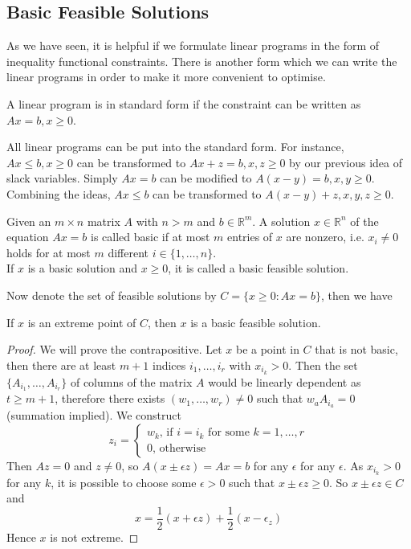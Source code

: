 \subsection{Basic Feasible Solutions}
As we have seen, it is helpful if we formulate linear programs in the form of inequality functional constraints.
There is another form which we can write the linear programs in order to make it more convenient to optimise.
\begin{definition}
    A linear program is in standard form if the constraint can be written as $Ax=b,x\ge 0$.
\end{definition}
All linear programs can be put into the standard form.
For instance, $Ax\le b,x\ge 0$ can be transformed to $Ax+z=b,x,z\ge 0$ by our previous idea of slack variables.
Simply $Ax=b$ can be modified to $A(x-y)=b,x,y\ge 0$.
Combining the ideas, $Ax\le b$ can be transformed to $A(x-y)+z,x,y,z\ge 0$.
\begin{definition}
    Given an $m\times n$ matrix $A$ with $n>m$ and $b\in\mathbb R^m$.
    A solution $x\in\mathbb R^n$ of the equation $Ax=b$ is called basic if at most $m$ entries of $x$ are nonzero, i.e. $x_i\neq 0$ holds for at most $m$ different $i\in\{1,\ldots,n\}$.\\
    If $x$ is a basic solution and $x\ge 0$, it is called a basic feasible solution.
\end{definition}
Now denote the set of feasible solutions by $C=\{x\ge 0:Ax=b\}$, then we have
\begin{theorem}
    If $x$ is an extreme point of $C$, then $x$ is a basic feasible solution.
\end{theorem}
\begin{proof}
    We will prove the contrapositive.
    Let $x$ be a point in $C$ that is not basic, then there are at least $m+1$ indices $i_1,\ldots,i_r$ with $x_{i_k}>0$.
    Then the set $\{A_{i_1},\dots,A_{i_r}\}$ of columns of the matrix $A$ would be linearly dependent as $t\ge m+1$, therefore there exists $(w_1,\ldots,w_r)\neq 0$ such that $w_aA_{i_a}=0$ (summation implied).
    We construct
    $$z_i=\begin{cases}
        w_k\text{, if $i=i_k$ for some $k=1,\ldots,r$}\\
        0\text{, otherwise}
    \end{cases}$$
    Then $Az=0$ and $z\neq 0$, so $A(x\pm\epsilon z)=Ax=b$ for any $\epsilon$ for any $\epsilon$.
    As $x_{i_k}>0$ for any $k$, it is possible to choose some $\epsilon>0$ such that $x\pm\epsilon z\ge 0$.
    So $x\pm\epsilon z\in C$ and
    $$x=\frac{1}{2}(x+\epsilon z)+\frac{1}{2}(x-\epsilon_z)$$
    Hence $x$ is not extreme.
\end{proof}
